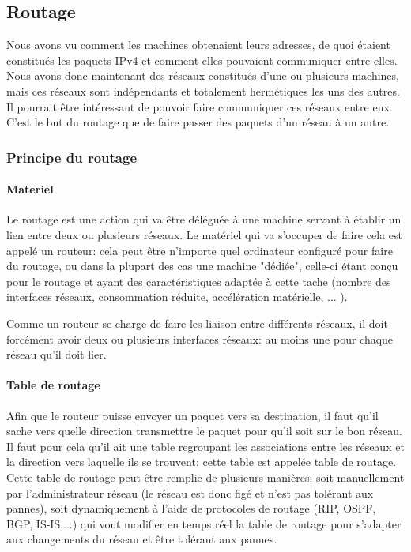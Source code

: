\subsection{Routage}

Nous avons vu comment les machines obtenaient leurs adresses, de quoi étaient constitués les
paquets IPv4 et comment elles pouvaient communiquer entre elles.  Nous avons
donc maintenant des réseaux constitués d'une ou plusieurs machines, mais ces
réseaux sont indépendants et totalement hermétiques les uns des autres. Il
pourrait être intéressant de pouvoir faire communiquer ces réseaux entre eux.
C'est le but du routage que de faire passer des paquets d'un réseau à un autre.

\subsubsection{Principe du routage}

\paragraph{Materiel}
Le routage est une action qui va être déléguée à une machine servant à établir
un lien entre deux ou plusieurs réseaux.  Le matériel qui va s'occuper de faire
cela est appelé un routeur: cela peut être n'importe quel ordinateur configuré
pour faire du routage, ou dans la plupart des cas une machine "dédiée", celle-ci
étant conçu pour le routage et ayant des caractéristiques adaptée à cette tache
(nombre des interfaces réseaux, consommation réduite, accélération matérielle, ... ).

Comme un routeur se charge de faire les liaison entre différents réseaux, il doit
forcément avoir deux ou plusieurs interfaces réseaux: au moins une pour chaque
réseau qu'il doit lier.

\paragraph{Table de routage}
Afin que le routeur puisse envoyer un paquet vers sa destination, il faut qu'il
sache vers quelle direction transmettre le paquet pour qu'il soit sur le bon
réseau. Il faut pour cela qu'il ait une table regroupant les associations entre
les réseaux et la direction vers laquelle ils se trouvent: cette table est
appelée table de routage.  Cette table de routage peut être remplie de plusieurs
manières: soit manuellement par l'administrateur réseau (le réseau est donc
figé et n'est pas tolérant aux pannes), soit dynamiquement à l'aide de
protocoles de routage (RIP, OSPF, BGP, IS-IS,...) qui vont modifier en temps
réel la table de routage pour s'adapter aux changements du réseau et être
tolérant aux pannes.

